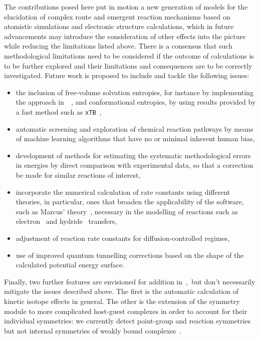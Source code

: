 The contributions posed here put in motion a new generation
of models for the elucidation of complex route and emergent reaction mechanisms
based on atomistic simulations and electronic structure calculations,
which in future advancements may introduce the consideration of other effects into the picture
while reducing the limitations listed above.
There is a consensus that such methodological limitations need
to be considered if the outcome of calculations is to be further explored
and their limitations and consequences are to be correctly investigated.
Future work is proposed to include and tackle the following issues:
%
\begin{itemize}
	\item the inclusion of free-volume solvation entropies, for instance
	      by implementing the approach in~\citeauthor{Garza_2019}~\cite{Garza_2019},
	      and conformational entropies, by using results provided by a fast method such as \texttt{xTB}~\cite{Bannwarth_2020},
	\item automatic screening and exploration of chemical reaction pathways
	      by means of machine learning algorithms that have no or minimal inherent human bias,
	\item development of methods for estimating the systematic methodological errors in energies
	      by direct comparison with experimental data, so that a correction be made for similar reactions of interest,
	\item incorporate the numerical calculation of rate constants using different theories,
	      in particular, ones that broaden the applicability of the software,
	      such as Marcus' theory~\cite{Miller_1984,Nobel_1992,Nikbin_2012},
	      necessary in the modelling of reactions
	      such as electron~\cite{Miller_1984} and hydride~\cite{Nikbin_2012} transfers,
	\item adjustment of reaction rate constants for diffusion-controlled regimes,
	\item use of improved quantum tunnelling corrections based on the shape of the calculated potential energy surface.
\end{itemize}

Finally, two further features are envisioned for addition in~\overreact{},~but don't necessarily mitigate the issues described above.
The first is the automatic calculation of kinetic isotope effects in general.
The other is the extension of the symmetry module to more complicated host-guest complexes
in order to account for their individual symmetries:
we currently detect point-group and reaction symmetries but not internal symmetries
of weakly bound complexes~\cite{Gilson_2010}.
